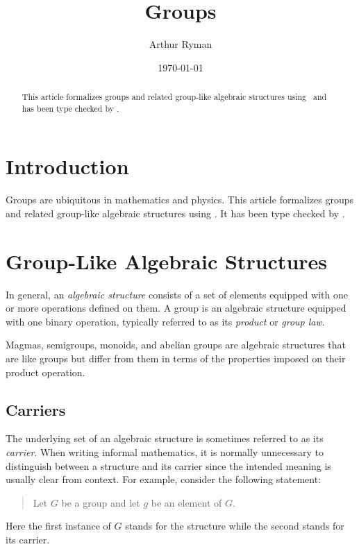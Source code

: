 \documentclass{amsart}
\begin{document}
\title{Groups}
\author{Arthur Ryman}
\date{\today}

\begin{abstract}
	This article formalizes groups and related group-like algebraic structures using 
	\ZN\ and has been type checked by \fuzz.
\end{abstract}

\maketitle

\tableofcontents

\section{Introduction}

Groups are ubiquitous in mathematics and physics.
This article formalizes groups and related group-like algebraic structures using 
\ZN\cite{spivey-zrm}.
It has been type checked by \fuzz\cite{spivey-fm}.

\section{Group-Like Algebraic Structures}

In general, an \textit{algebraic structure} consists of a set of elements 
equipped with one or more operations defined on them.
A group is an algebraic structure equipped with one binary operation, typically referred to
as its \textit{product} or \textit{group law}.

Magmas, semigroups, monoids, and abelian groups are 
algebraic structures that are like groups but differ from them 
in terms of the properties imposed on their product operation.

\subsection{Carriers}

The underlying set of an algebraic structure is sometimes referred to as its \textit{carrier}.
When writing informal mathematics, 
it is normally unnecessary to distinguish between a structure and its carrier
since the intended meaning is usually clear from context.
For example, consider the following statement:
\begin{quote}
	Let $G$ be a group and let $g$ be an element of $G$.
\end{quote}
Here the first instance of $G$ stands for the structure while the second stands for its carrier.
\end{document}
